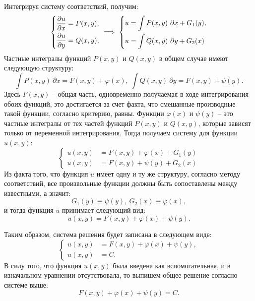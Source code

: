 	Интегрируя систему соответствий, получим:
	\[ \left\lbrace \begin{split} 
		\dfrac{\partial u}{\partial x} &= P(x, y), \\
		\dfrac{\partial u}{\partial y} &= Q(x, y),
	\end{split} \right. \implies \left\lbrace \begin{split} 
		u &= \int P(x, y) ~ \partial x + G_1(y), \\
		u &= \int Q(x, y) ~ \partial y + G_2(x)
	\end{split} \right. \]
	Частные интегралы функций $P(x, y)$ и $Q(x, y)$ в общем случае имеют следующую структуру:
	\[ \int P(x, y) ~ \partial x = F(x, y) + \varphi(x), ~ \int Q(x, y) ~ \partial y = F(x, y) + \psi(y). \]
	Здесь $F(x, y)$ -- общая часть, одновременно получаемая в ходе интегрирования обоих функций, это достигается за счет факта, что смешанные производные такой функции, согласно критерию, равны. Функции $\varphi(x)$ и $\psi(y)$ -- это частные интегралы от тех частей функций $P(x, y)$ и $Q(x, y)$, которые зависят только от переменной интегрирования. Тогда получаем систему для функции $u(x, y)$:
	\[ \left\lbrace \begin{split} u(x, y) &= F(x, y) + \varphi(x) + G_1(y) \\ u(x, y) &= F(x, y) + \psi(y) + G_2(x) \end{split} \right. \]
	Из факта того, что функция $u$ имеет одну и ту же структуру, согласно методу соответствий, все произвольные функции должны быть сопоставлены между известными, а значит:
	\[ G_1(y) \equiv \psi(y), ~ G_2(x) \equiv \varphi(x), \]
	и тогда функция $u$ принимает следующий вид:
	\[ u(x, y) = F(x, y) + \varphi(x) + \psi(y). \]

	Таким образом, система решения будет записана в следующем виде:
	\[ \left\lbrace \begin{split} u(x, y) &= F(x, y) + \varphi(x) + \psi(y), \\ u(x, y) &= C. \end{split} \right. \]
	В силу того, что функция $u(x, y)$ была введена как вспомогательная, и в изначальном уравнении отсутствовала, то выпишем общее решение согласно системе выше:
	\[ F(x, y) + \varphi(x) + \psi(y) = C. \]

